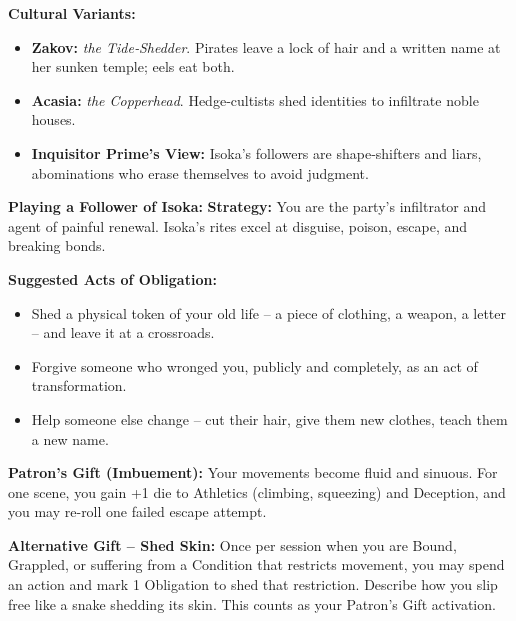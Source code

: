 \documentclass[10pt,a5paper]{book}
\begin{document}
\textbf{Cultural Variants:}
\begin{itemize}
    \item \textbf{Zakov:} \textit{the Tide‑Shedder}. Pirates leave a lock of hair and a written name at her sunken temple; eels eat both.
    \item \textbf{Acasia:} \textit{the Copperhead}. Hedge‑cultists shed identities to infiltrate noble houses.
    \item \textbf{Inquisitor Prime's View:} Isoka's followers are shape‑shifters and liars, abominations who erase themselves to avoid judgment.
\end{itemize}

\textbf{Playing a Follower of Isoka:}
\textbf{Strategy:} You are the party's infiltrator and agent of painful renewal. Isoka's rites excel at disguise, poison, escape, and breaking bonds.

\textbf{Suggested Acts of Obligation:}
\begin{itemize}
    \item Shed a physical token of your old life -- a piece of clothing, a weapon, a letter -- and leave it at a crossroads.
    \item Forgive someone who wronged you, publicly and completely, as an act of transformation.
    \item Help someone else change -- cut their hair, give them new clothes, teach them a new name.
\end{itemize}

\textbf{Patron's Gift (Imbuement):} Your movements become fluid and sinuous. For one scene, you gain +1 die to Athletics (climbing, squeezing) and Deception, and you may re-roll one failed escape attempt.

\textbf{Alternative Gift -- Shed Skin:} Once per session when you are Bound, Grappled, or suffering from a Condition that restricts movement, you may spend an action and mark 1 Obligation to shed that restriction. Describe how you slip free like a snake shedding its skin. This counts as your Patron's Gift activation.
\end{document}
